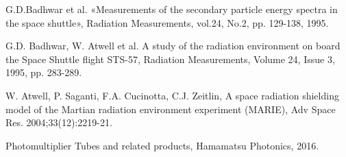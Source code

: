 \documentclass[12pt,a4paper]{report} %
\begin{document}
\begin{thebibliography}{00}
G.D.Badhwar et al. «Measurements of the secondary particle energy spectra in the space shuttle», Radiation Measurements, vol.24, No.2, pp. 129-138, 1995.

G.D. Badhwar, W. Atwell et al. A study of the radiation environment on board the Space Shuttle flight STS-57, Radiation Measurements, Volume 24, Issue 3, 1995, pp. 283-289.

W. Atwell, P. Saganti, F.A. Cucinotta, C.J. Zeitlin, A space radiation shielding model of the Martian radiation environment experiment (MARIE), Adv Space Res. 2004;33(12):2219-21.

Photomultiplier Tubes and related products, Hamamatsu Photonics, 2016.
\end{thebibliography}
\end{document}
